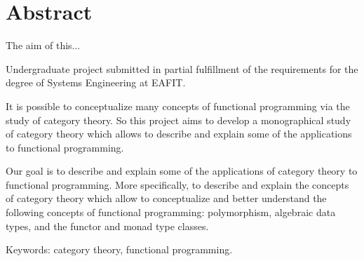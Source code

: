 \chapter{Abstract}

The aim of this... %

Undergraduate project submitted in partial fulfillment of the
requirements for the degree of Systems Engineering at EAFIT.

It is possible to conceptualize many concepts of functional
programming via the study of category theory. So this project aims to
develop a monographical study of category theory which allows to
describe and explain some of the applications to functional
programming.

Our goal is to describe and explain some of the applications of
category theory to functional programming. More specifically, to
describe and explain the concepts of category theory which allow to
conceptualize and better understand the following concepts of
functional programming: polymorphism, algebraic data types, and the
functor and monad type classes.

\noindent Keywords: category theory, functional programming.

\clearemptydoublepage

